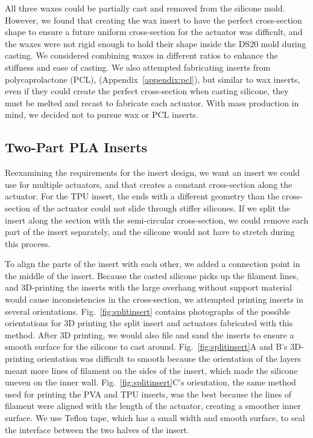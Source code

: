All three waxes could be partially cast and removed from the silicone mold. However, we found that creating the wax insert to have the perfect cross-section shape to ensure a future uniform cross-section for the actuator was difficult, and the waxes were not rigid enough to hold their shape inside the DS20 mold during casting. We considered combining waxes in different ratios to enhance the stiffness and ease of casting. We also attempted fabricating inserts from polycaprolactone (PCL), (Appendix~\ref{appendix:pcl}), but similar to wax inserts, even if they could create the perfect cross-section when casting silicone, they must be melted and recast to fabricate each actuator. 
With mass production in mind, we decided not to pursue wax or PCL inserts. 

\subsection{Two-Part PLA Inserts}

Reexamining the requirements for the insert design, we want an insert we could use for multiple actuators, and that creates a constant cross-section along the actuator. For the TPU insert, the ends with a different geometry than the cross-section of the actuator could not slide through stiffer silicones. If we split the insert along the section with the semi-circular cross-section, we could remove each part of the insert separately, and the silicone would not have to stretch during this process. 

To align the parts of the insert with each other, we added a connection point in the middle of the insert. Because the casted silicone picks up the filament lines, and 3D-printing the inserts with the large overhang without support material would cause inconsistencies in the cross-section, we attempted printing inserts in several orientations. Fig.~\ref{fig:splitinsert} contains photographs of the possible orientations for 3D printing the split insert and actuators fabricated with this method. After 3D printing, we would also file and sand the inserts to ensure a smooth surface for the silicone to cast around. Fig.~\ref{fig:splitinsert}A and B's 3D-printing orientation was difficult to smooth because the orientation of the layers meant more lines of filament on the sides of the insert, which made the silicone uneven on the inner wall. Fig.~\ref{fig:splitinsert}C's orientation, the same method used for printing the PVA and TPU inserts, was the best because the lines of filament were aligned with the length of the actuator, creating a smoother inner surface. We use Teflon tape, which has a small width and smooth surface, to seal the interface between the two halves of the insert. \\


